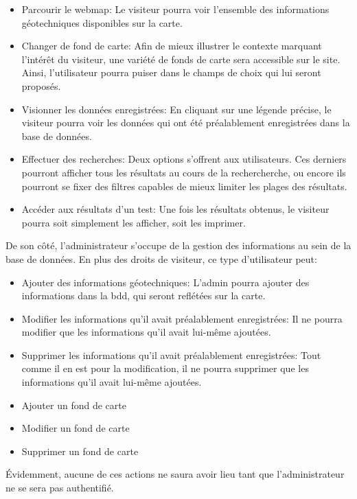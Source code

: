 \begin{itemize}
    \item Parcourir le webmap: Le visiteur pourra voir l'ensemble des informations 
    géotechniques disponibles sur la carte.
    \item Changer de fond de carte: Afin de mieux illustrer le contexte marquant 
    l'intérêt du visiteur, une variété de fonds de carte sera accessible sur le site. 
    Ainsi, l'utilisateur pourra puiser dans le champs de choix qui lui seront proposés.
    \item Visionner les données enregistrées: En cliquant sur une légende précise, 
    le visiteur pourra voir les données qui ont été préalablement enregistrées dans la base de données.
    \item Effectuer des recherches: Deux options s'offrent aux utilisateurs. Ces derniers 
    pourront afficher tous les résultats au cours de la rechercherche, ou encore ils pourront 
    se fixer des filtres capables de mieux limiter les plages des résultats.
    \item Accéder aux résultats d'un test: Une fois les résultats obtenus, le visiteur 
    pourra soit simplement les afficher, soit les imprimer.
\end{itemize}

\par 
De son côté, l'administrateur s'occupe de la gestion des informations au sein de la base 
de données. En plus des droits de visiteur, ce type d'utilisateur peut:
\begin{itemize}
    \item Ajouter des informations géotechniques: L'admin pourra ajouter des informations 
    dans la bdd, qui seront reflétées sur la carte. 
    \item Modifier les informations qu'il avait préalablement enregistrées: Il ne pourra 
    modifier que les informations qu'il avait lui-même ajoutées.
    \item Supprimer les informations qu'il avait préalablement enregistrées: Tout comme il 
    en est pour la modification, il ne pourra supprimer que les informations qu'il avait lui-même ajoutées.
    \item Ajouter un fond de carte
    \item Modifier un fond de carte
    \item Supprimer un fond de carte
\end{itemize}

\par 
Évidemment, aucune de ces actions ne saura avoir lieu tant que l'administrateur ne se sera pas authentifié.

